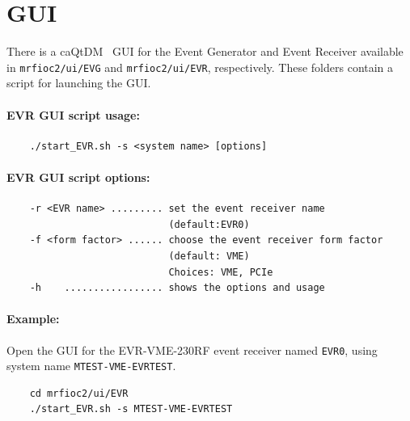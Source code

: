 \documentclass[12pt,a4paper]{article}
\let\stdsection\section
\renewcommand\section{\newpage\stdsection}
\begin{document}


\section{GUI}\label{sec:GUI}
There is a caQtDM~\cite{caqtdm} GUI for the Event Generator and Event Receiver available in \texttt{mrfioc2/ui/EVG} and \texttt{mrfioc2/ui/EVR}, respectively. These folders contain a script for launching the GUI.

\paragraph{EVR GUI script usage:}
\begin{verbatim}
	./start_EVR.sh -s <system name> [options]
\end{verbatim}


\paragraph{EVR GUI script options:}
\begin{verbatim}
	-r <EVR name> ......... set the event receiver name 
	                        (default:EVR0)
	-f <form factor> ...... choose the event receiver form factor 
	                        (default: VME)
	                        Choices: VME, PCIe
	-h    ................. shows the options and usage
\end{verbatim}


\paragraph{Example:} Open the GUI for the EVR-VME-230RF event receiver named \texttt{EVR0}, using system name \texttt{MTEST-VME-EVRTEST}.
\begin{verbatim}
	cd mrfioc2/ui/EVR
	./start_EVR.sh -s MTEST-VME-EVRTEST
\end{verbatim}




\end{document}
